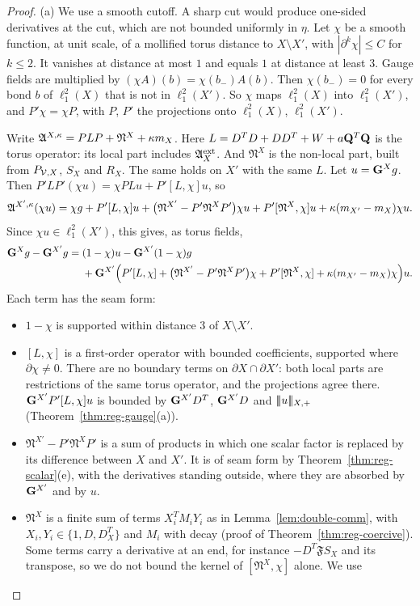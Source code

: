 \begin{proof}
(a) We use a smooth cutoff. A sharp cut would produce one-sided derivatives at the cut, which are not bounded uniformly in $\eta$. Let $\chi$ be a smooth function, at unit scale, of a mollified torus distance to $X\setminus X'$, with $|\partial^k\chi|\le C$ for $k\le2$. It vanishes at distance at most $1$ and equals $1$ at distance at least $3$. Gauge fields are multiplied by $(\chi A)(b)=\chi(b_-)A(b)$. Then $\chi(b_-)=0$ for every bond $b$ of $\ell^2_1(X)$ that is not in $\ell^2_1(X')$. So $\chi$ maps $\ell^2_1(X)$ into $\ell^2_1(X')$, and $P'\chi=\chi P$, with $P$, $P'$ the projections onto $\ell^2_1(X)$, $\ell^2_1(X')$.

Write $\mathfrak A^{X,\kappa}=PLP+\mathfrak N^X+\kappa m_X$. Here $L=D^TD+DD^T+W+a\mathbf Q^T\mathbf Q$ is the torus operator: its local part includes $\mathfrak A^{\rm ext}_X$. And $\mathfrak N^X$ is the non-local part, built from $P_{\mathcal V,X}$, $S_X$ and $R_X$. The same holds on $X'$ with the same $L$. Let $u=\mathbf G^Xg$. Then $P'LP'(\chi u)=\chi PLu+P'[L,\chi]u$, so
\[
\mathfrak A^{X',\kappa}(\chi u)=\chi g+P'[L,\chi]u+\big(\mathfrak N^{X'}-P'\mathfrak N^XP'\big)\chi u+P'[\mathfrak N^X,\chi]u+\kappa(m_{X'}-m_X)\chi u .
\]
Since $\chi u\in\ell^2_1(X')$, this gives, as torus fields,
\[
\begin{aligned}
\mathbf G^Xg-\mathbf G^{X'}g={}&(1-\chi)u-\mathbf G^{X'}(1-\chi)g\\
&+\mathbf G^{X'}\Big(P'[L,\chi]+\big(\mathfrak N^{X'}-P'\mathfrak N^XP'\big)\chi+P'[\mathfrak N^X,\chi]+\kappa(m_{X'}-m_X)\chi\Big)u .
\end{aligned}
\]
Each term has the seam form:
\begin{itemize}
\item $1-\chi$ is supported within distance $3$ of $X\setminus X'$.
\item $[L,\chi]$ is a first-order operator with bounded coefficients, supported where $\partial\chi\ne0$. There are no boundary terms on $\partial X\cap\partial X'$: both local parts are restrictions of the same torus operator, and the projections agree there. $\mathbf G^{X'}P'[L,\chi]u$ is bounded by $\mathbf G^{X'}D^T$, $\mathbf G^{X'}D$ and $|\!|\!|u|\!|\!|_{X,+}$ (Theorem~\ref{thm:reg-gauge}(a)).
\item $\mathfrak N^{X'}-P'\mathfrak N^XP'$ is a sum of products in which one scalar factor is replaced by its difference between $X$ and $X'$. It is of seam form by Theorem~\ref{thm:reg-scalar}(e), with the derivatives standing outside, where they are absorbed by $\mathbf G^{X'}$ and by $u$.
\item $\mathfrak N^X$ is a finite sum of terms $X_i^TM_iY_i$ as in Lemma~\ref{lem:double-comm}, with $X_i,Y_i\in\{1,D,D^T_X\}$ and $M_i$ with decay (proof of Theorem~\ref{thm:reg-coercive}). Some terms carry a derivative at an end, for instance $-D^T\mathfrak FS_X$ and its transpose, so we do not bound the kernel of $[\mathfrak N^X,\chi]$ alone. We use

\end{itemize}
\end{proof}

